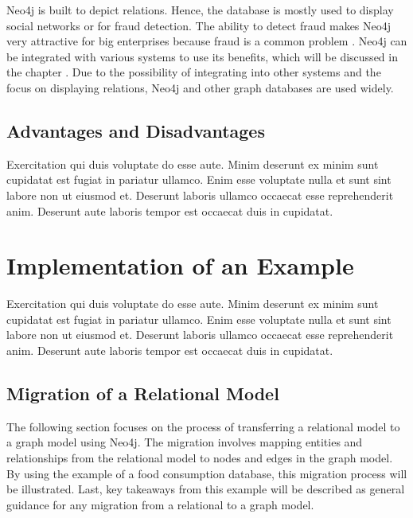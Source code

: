 Neo4j is built to depict relations. Hence, the database is mostly used to display social networks or for fraud detection. The ability to detect fraud makes Neo4j very attractive for big enterprises because fraud is a common problem \parencite{Neo4jfeatures}. Neo4j can be integrated with various systems to use its benefits, which will be discussed in the chapter . Due to the possibility of integrating into other systems and the focus on displaying relations, Neo4j and other graph databases 
are used widely.

\subsection{Advantages and Disadvantages} \label{subsec:advantagesDisadvantagesNeo4j}

Exercitation qui duis voluptate do esse aute. Minim deserunt ex minim sunt cupidatat est fugiat in pariatur ullamco. Enim esse voluptate nulla et sunt sint labore non ut eiusmod et. Deserunt laboris ullamco occaecat esse reprehenderit anim. Deserunt aute laboris tempor est occaecat duis in cupidatat.


\section{Implementation of an Example}\label{sec:implementationExampleNeo4j}

Exercitation qui duis voluptate do esse aute. Minim deserunt ex minim sunt cupidatat est fugiat in pariatur ullamco. Enim esse voluptate nulla et sunt sint labore non ut eiusmod et. Deserunt laboris ullamco occaecat esse reprehenderit anim. Deserunt aute laboris tempor est occaecat duis in cupidatat.

\subsection{Migration of a Relational Model}\label{subsec:migrationRelationModelNeo4j}

The following section focuses on the process of transferring a relational model to a graph model using Neo4j. The migration involves mapping entities and relationships from the relational model to nodes and edges in the graph model. By using the example of a food consumption database, this migration process will be illustrated. Last, key takeaways from this example will be described as general guidance for any migration from a relational to a graph model.

